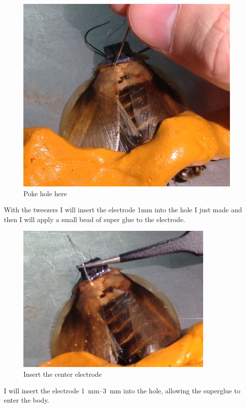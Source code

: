 {\begin{figure}[ht!]
\centering
\includegraphics[scale=0.5]{Surgery Photos/hole.jpg}
\caption{Poke hole here}
\label{fig:hole}
\end{figure}}
With the tweezers I will insert the electrode 1mm into the hole I just made and then I will apply a small bead of super glue to the electrode.
{\begin{figure}[ht!]
\centering
\includegraphics[scale=0.5]{Surgery Photos/celectrode1.jpg}
\caption{Insert the center electrode}
\label{fig:celectrode1}
\end{figure}}
I will insert the electrode \SIrange{1}{3}{\milli\meter} into the hole, allowing the superglue to enter the body. 
